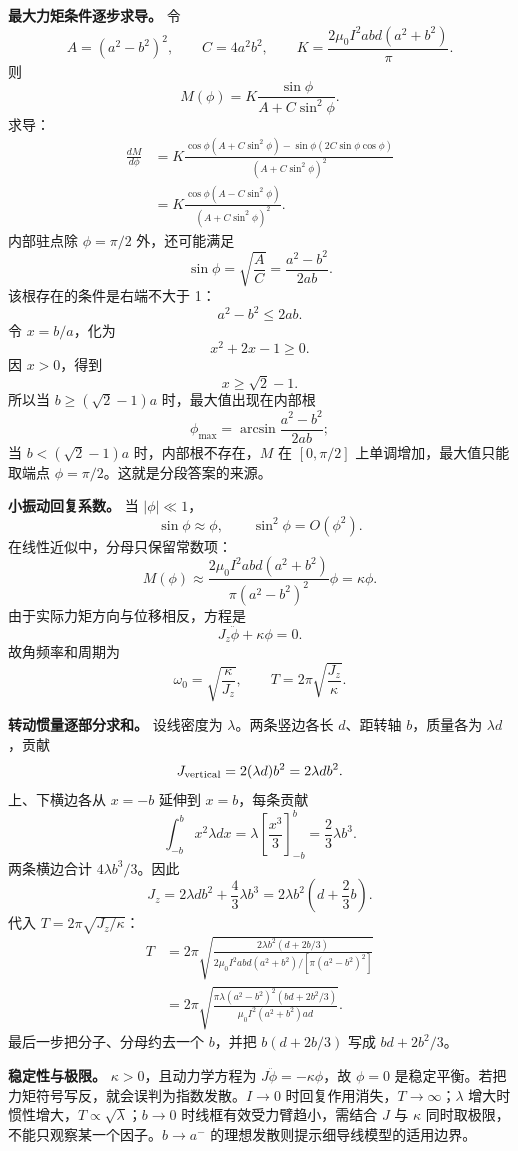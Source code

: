 \documentclass[12pt,a4paper,UTF8]{ctexart}
\begin{document}
\textbf{最大力矩条件逐步求导。} 令 \[
A=(a^2-b^2)^2,\qquad C=4a^2b^2,\qquad
K=\frac{2\mu_0I^2abd(a^2+b^2)}\pi.
\] 则 \[
M(\phi)=K\frac{\sin\phi}{A+C\sin^2\phi}.
\] 求导： \[
\begin{aligned}
\frac{dM}{d\phi}
&=K\frac{
\cos\phi(A+C\sin^2\phi)
-\sin\phi(2C\sin\phi\cos\phi)}
{(A+C\sin^2\phi)^2}\\
&=K\frac{\cos\phi(A-C\sin^2\phi)}
{(A+C\sin^2\phi)^2}.
\end{aligned}
\] 内部驻点除 \(\phi=\pi/2\) 外，还可能满足 \[
\sin\phi=\sqrt{\frac AC}
=\frac{a^2-b^2}{2ab}.
\] 该根存在的条件是右端不大于 1： \[
a^2-b^2\le2ab.
\] 令 \(x=b/a\)，化为 \[
x^2+2x-1\ge0.
\] 因 \(x>0\)，得到 \[
x\ge\sqrt2-1.
\] 所以当 \(b\ge(\sqrt2-1)a\) 时，最大值出现在内部根 \[
\phi_{\max}=\arcsin\frac{a^2-b^2}{2ab};
\] 当 \(b<(\sqrt2-1)a\) 时，内部根不存在，\(M\) 在 \([0,\pi/2]\)
上单调增加，最大值只能取端点 \(\phi=\pi/2\)。这就是分段答案的来源。

\textbf{小振动回复系数。} 当 \(|\phi|\ll1\)， \[
\sin\phi\approx\phi,\qquad
\sin^2\phi=O(\phi^2).
\] 在线性近似中，分母只保留常数项： \[
M(\phi)\approx
\frac{2\mu_0I^2abd(a^2+b^2)}
{\pi(a^2-b^2)^2}\phi
=\kappa\phi.
\] 由于实际力矩方向与位移相反，方程是 \[
J_z\ddot\phi+\kappa\phi=0.
\] 故角频率和周期为 \[
\omega_0=\sqrt{\frac\kappa{J_z}},
\qquad T=2\pi\sqrt{\frac{J_z}{\kappa}}.
\]

\textbf{转动惯量逐部分求和。} 设线密度为 \(\lambda\)。两条竖边各长
\(d\)、距转轴 \(b\)，质量各为 \(\lambda d\)，贡献 \[
J_{\rm vertical}=2(\lambda d)b^2=2\lambda db^2.
\] 上、下横边各从 \(x=-b\) 延伸到 \(x=b\)，每条贡献 \[
\int_{-b}^{b}x^2\lambda dx
=\lambda\left[\frac{x^3}{3}\right]_{-b}^{b}
=\frac23\lambda b^3.
\] 两条横边合计 \(4\lambda b^3/3\)。因此 \[
J_z=2\lambda db^2+\frac43\lambda b^3
=2\lambda b^2\left(d+\frac23b\right).
\] 代入 \(T=2\pi\sqrt{J_z/\kappa}\)： \[
\begin{aligned}
T
&=2\pi\sqrt{
\frac{2\lambda b^2(d+2b/3)}
{2\mu_0I^2abd(a^2+b^2)/[\pi(a^2-b^2)^2]}}\\
&=2\pi\sqrt{
\frac{\pi\lambda(a^2-b^2)^2
(bd+2b^2/3)}
{\mu_0I^2(a^2+b^2)ad}}.
\end{aligned}
\] 最后一步把分子、分母约去一个 \(b\)，并把 \(b(d+2b/3)\) 写成
\(bd+2b^2/3\)。

\textbf{稳定性与极限。} \(\kappa>0\)，且动力学方程为
\(J\ddot\phi=-\kappa\phi\)，故 \(\phi=0\)
是稳定平衡。若把力矩符号写反，就会误判为指数发散。\(I\to0\)
时回复作用消失，\(T\to\infty\)；\(\lambda\)
增大时惯性增大，\(T\propto\sqrt\lambda\)；\(b\to0\)
时线框有效受力臂趋小，需结合 \(J\) 与 \(\kappa\)
同时取极限，不能只观察某一个因子。\(b\to a^-\)
的理想发散则提示细导线模型的适用边界。
\end{document}
